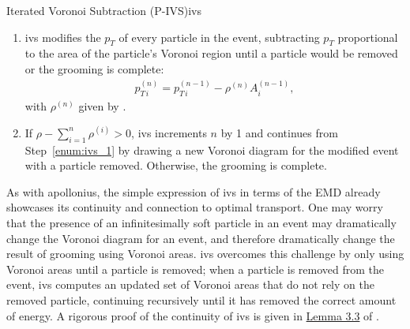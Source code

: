 \begin{definitionbox}{Iterated Voronoi Subtraction (P-IVS)}{ivs}
\begin{enumerate}
        \item
        \gls{ivs} modifies the \(p_T\) of every particle in the event, subtracting \(p_T\) proportional to the area of the particle's Voronoi region until a particle would be removed or the grooming is complete:
        \begin{align}
        \label{eq:ivs_2}
        p_{T\,i}^{(n)} = p_{T\,i}^{(n-1)} - \rho^{(n)} A^{(n-1)}_i,
        \end{align}
        with \(\rho^{(n)}\) given by .
        \label{enum:ivs_2}

        \item
        If \(\rho - \sum_{i = 1}^n \rho^{(i)} > 0\), \gls{ivs} increments \(n\) by 1 and continues from Step~\ref{enum:ivs_1} by drawing a new Voronoi diagram for the modified event with a particle removed.
        Otherwise, the grooming is complete.
        \label{enum:ivs_3}
    \end{enumerate}

\end{definitionbox}


As with \gls{apollonius}, the simple expression of \gls{ivs} in terms of the EMD already showcases its continuity and connection to optimal transport.
%
One may worry that the presence of an infinitesimally soft particle in an event may dramatically change the Voronoi diagram for an event, and therefore dramatically change the result of grooming using Voronoi areas.
%
\gls{ivs} overcomes this challenge by only using Voronoi areas until a particle is removed;
%
when a particle is removed from the event, \gls{ivs} computes an updated set of Voronoi areas that do not rely on the removed particle, continuing recursively until it has removed the correct amount of energy.
%
A rigorous proof of the continuity of \gls{ivs} is given in \href{https://arxiv.org/pdf/1706.07403.pdf#page=15&zoom=100,0,200}{Lemma 3.3} of .



